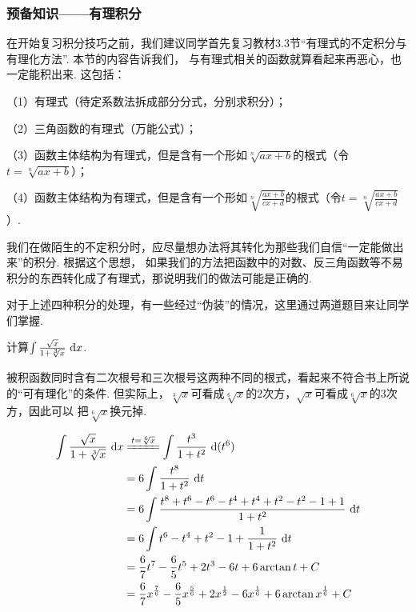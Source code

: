 \subsubsection{预备知识——有理积分}
在开始复习积分技巧之前，我们建议同学首先复习教材3.3节“有理式的不定积分与有理化方法”.
本节的内容告诉我们，
与有理式相关的函数就算看起来再恶心，也一定能积出来. 这包括：\par
（1）有理式（待定系数法拆成部分分式，分别求积分）；\par
（2）三角函数的有理式（万能公式）；\par
（3）函数主体结构为有理式，但是含有一个形如$\sqrt[n]{ax+b}$的根式（令$t=\sqrt[n]{ax+b}$）；\par
（4）函数主体结构为有理式，但是含有一个形如$\sqrt[n]{\frac{ax+b}{cx+d}}$的根式（令$t=\sqrt[n]{\frac{ax+b}{cx+d}}$）.\vspace{0.5em}

我们在做陌生的不定积分时，应尽量想办法将其转化为那些我们自信“一定能做出来”的积分. 根据这个思想，
如果我们的方法把函数中的对数、反三角函数等不易积分的东西转化成了有理式，那说明我们的做法可能是正确的.\par
对于上述四种积分的处理，有一些经过“伪装”的情况，这里通过两道题目来让同学们掌握.

\begin{example}
\label{ex:ch03-01}
计算$\int \frac{\sqrt{x}}{1+\sqrt[3]{x}}~\mathrm{d} x$.
\end{example}

\begin{analysis}
被积函数同时含有二次根号和三次根号这两种不同的根式，看起来不符合书上所说的“可有理化”的条件.
但实际上，$\sqrt[3]{x}$可看成$\sqrt[6]{x}$的$2$次方，$\sqrt{x}$可看成$\sqrt[6]{x}$的$3$次方，因此可以
把$\sqrt[6]{x}$换元掉.
\end{analysis}

\begin{solution}
\begin{equation}
    \begin{aligned}
        \int \frac{\sqrt{x}}{1+\sqrt[3]{x}}~\d x
        &\xlongequal{t=\sqrt[6]{x}}
         \int \frac{t^3}{1+t^2}~\d(t^6) \\
        &= 6\int \frac{t^8}{1+t^2}~\d t \\
        &= 6\int \frac{t^8+t^6-t^6-t^4+t^4+t^2-t^2-1+1}{1+t^2}~\d t \\
        &= 6\int t^6 - t^4 + t^2 -1 + \frac{1}{1+t^2}~\d t \\
        &= \frac{6}{7}t^7 - \frac{6}{5}t^5 + 2t^3 - 6t +6\arctan{t} +C \\
        &= \frac{6}{7}x^{\frac{7}{6}} - \frac{6}{5}x^{\frac{5}{6}} + 2x^{\frac{1}{2}} - 6x^{\frac{1}{6}} +6\arctan{x^{\frac{1}{6}}} +C
        \nonumber
    \end{aligned}
\end{equation}
\end{solution}

